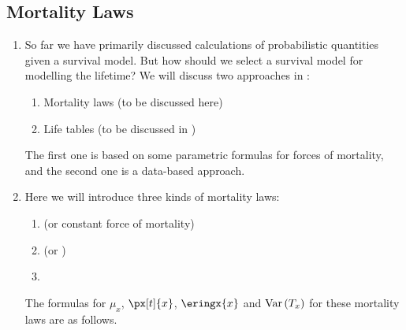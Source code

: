 \subsection{Mortality Laws}
\label{subsect:mortality-laws}
\begin{enumerate}
\item So far we have primarily discussed calculations of probabilistic
quantities given a survival model. But how should we select a survival model
for modelling the lifetime? We will discuss two approaches in
:
\begin{enumerate}[label={(\arabic*)}]
\item Mortality laws (to be discussed here)
\item Life tables (to be discussed in )
\end{enumerate}
The first one is based on some parametric formulas for forces of mortality, and
the second one is a data-based approach.

\item \label{it:mort-laws-fmlas} Here we will introduce three kinds of
mortality laws:
\begin{enumerate}[label={(\arabic*)}]
\item {} (or constant force of mortality)
\item {} (or )
\item {}
\end{enumerate}
The formulas for \(\mu_x\), \(\px[t]{x}\), \(\eringx{x}\) and \(\operatorname{Var}\qty(T_x)\) for
these mortality laws are as follows.


\end{enumerate}
